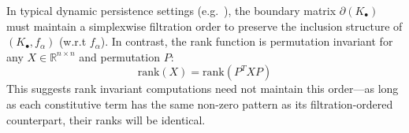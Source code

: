 \documentclass[10pt]{article}
\numberwithin{equation}{section}
\newcommand{\+}{%
	\raisebox{0.18ex}{\scaleobj{0.55}{+}}
}
\theoremstyle{definition}
\theoremstyle{definition}
\begin{document}
In typical dynamic persistence settings (e.g.~\cite{cohen2006vines}), the boundary matrix $\partial(K_\bullet)$ must maintain a simplexwise filtration order to preserve the inclusion structure of $(K_\bullet, f_\alpha)$ (w.r.t $f_\alpha$).
In contrast, the rank function is permutation invariant for any $X \in \mathbb{R}^{n \times n}$ and permutation $P$: 
$$ \mathrm{rank}(X) = \mathrm{rank}(P^T X  P) $$
This suggests rank invariant computations need not maintain this order---as long as each constitutive term has the same non-zero pattern as its filtration-ordered counterpart, their ranks will be identical.
\end{document}
